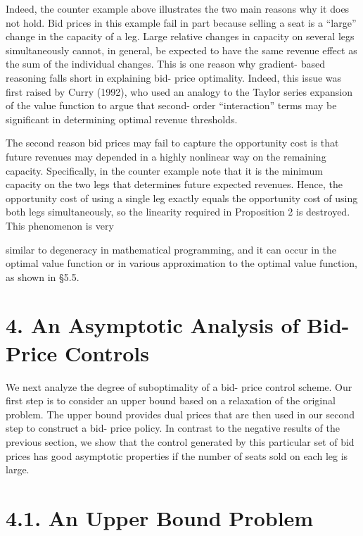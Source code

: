 Indeed, the counter example above illustrates the two main reasons why
it does not hold. Bid prices in this example fail in part because
selling a seat is a ``large'' change in the capacity of a leg. Large
relative changes in capacity on several legs simultaneously cannot, in
general, be expected to have the same revenue effect as the sum of the
individual changes. This is one reason why gradient- based reasoning
falls short in explaining bid- price optimality. Indeed, this issue was
first raised by Curry (1992), who used an analogy to the Taylor series
expansion of the value function to argue that second- order
``interaction'' terms may be significant in determining optimal revenue
thresholds.

The second reason bid prices may fail to capture the opportunity cost is
that future revenues may depended in a highly nonlinear way on the
remaining capacity. Specifically, in the counter example note that it is
the minimum capacity on the two legs that determines future expected
revenues. Hence, the opportunity cost of using a single leg exactly
equals the opportunity cost of using both legs simultaneously, so the
linearity required in Proposition 2 is destroyed. This phenomenon is
very

similar to degeneracy in mathematical programming, and it can occur in
the optimal value function or in various approximation to the optimal
value function, as shown in §5.5.

\section{4. An Asymptotic Analysis of Bid-Price
Controls}\label{an-asymptotic-analysis-of-bid-price-controls}

We next analyze the degree of suboptimality of a bid- price control
scheme. Our first step is to consider an upper bound based on a
relaxation of the original problem. The upper bound provides dual prices
that are then used in our second step to construct a bid- price policy.
In contrast to the negative results of the previous section, we show
that the control generated by this particular set of bid prices has good
asymptotic properties if the number of seats sold on each leg is large.

\section{4.1. An Upper Bound Problem}\label{an-upper-bound-problem}

